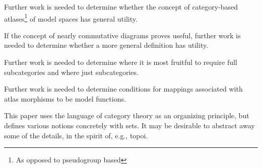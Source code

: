 \documentclass{article}
\begin{document}
Further work is needed to determine whether the concept of
category-based atlases\footnote{As opposed to pseudogroup based}
of model spaces has general utility.

If the concept of nearly commutative diagrams proves useful, further
work is needed to determine whether a more general definition has
utility.

Further work is needed to determine where it is most fruitful to require
full subcategories and where just subcategories.

Further work is needed to determine conditions for mappings associated
with atlas morphisms to be model functions.

This paper uses the language of category theory as an organizing
principle, but defines various notions concretely with sets. It may be
desirable to abstract away some of the details, in the spirit of, e.g.,
topoi.



\end{document}
